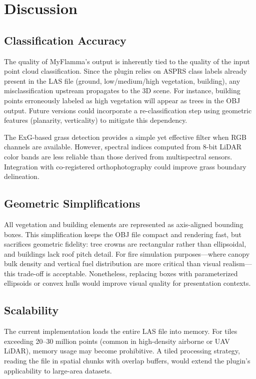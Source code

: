 \section{Discussion}
\label{sec:discussion}

\subsection{Classification Accuracy}

The quality of MyFlamma's output is inherently tied to the quality of the input point cloud classification. Since the plugin relies on ASPRS class labels already present in the LAS file (ground, low/medium/high vegetation, building), any misclassification upstream propagates to the 3D scene. For instance, building points erroneously labeled as high vegetation will appear as trees in the OBJ output. Future versions could incorporate a re-classification step using geometric features (planarity, verticality) to mitigate this dependency.

The ExG-based grass detection provides a simple yet effective filter when RGB channels are available. However, spectral indices computed from 8-bit LiDAR color bands are less reliable than those derived from multispectral sensors. Integration with co-registered orthophotography could improve grass boundary delineation.

\subsection{Geometric Simplifications}

All vegetation and building elements are represented as axis-aligned bounding boxes. This simplification keeps the OBJ file compact and rendering fast, but sacrifices geometric fidelity: tree crowns are rectangular rather than ellipsoidal, and buildings lack roof pitch detail. For fire simulation purposes---where canopy bulk density and vertical fuel distribution are more critical than visual realism---this trade-off is acceptable. Nonetheless, replacing boxes with parameterized ellipsoids or convex hulls would improve visual quality for presentation contexts.

\subsection{Scalability}

The current implementation loads the entire LAS file into memory. For tiles exceeding 20--30 million points (common in high-density airborne or UAV LiDAR), memory usage may become prohibitive. A tiled processing strategy, reading the file in spatial chunks with overlap buffers, would extend the plugin's applicability to large-area datasets.

